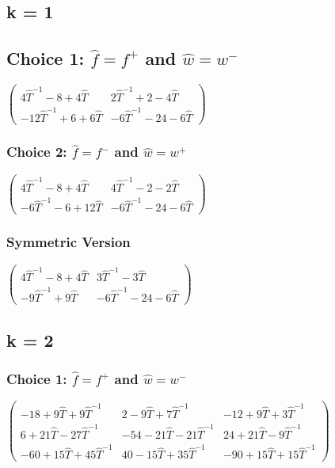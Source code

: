 \documentclass[10pt,letterpaper]{article}
\begin{document}
\subsection{k = 1}
\subsection{Choice 1: $\hat{f} = f^+$ and $\hat{w} = w^-$}
$\left(
\begin{array}{cc}
 4\hat{T}^{-1} -8+4 \hat{T} & 2\hat{T}^{-1}+2-4 \hat{T} \\
 -12 \hat{T}^{-1} +6+6 \hat{T} & -6 \hat{T}^{-1} -24-6 \hat{T}
 \end{array}\right)$
 
 \subsubsection{Choice 2: $\hat{f} = f^-$ and $\hat{w} = w^+$}
 $\left(
\begin{array}{cc}
4\hat{T}^{-1} -8+4 \hat{T} & 4\hat{T}^{-1}-2-2 \hat{T} \\
-6 \hat{T}^{-1} -6+12 \hat{T} & -6 \hat{T}^{-1} -24-6 \hat{T}
\end{array}\right)$

\subsubsection{Symmetric Version}
$\left(\begin{array}{cc}
4\hat{T}^{-1} -8+4 \hat{T} & 3\hat{T}^{-1}-3 \hat{T} \\
-9 \hat{T}^{-1} +9 \hat{T} & -6 \hat{T}^{-1} -24-6 \hat{T}
\end{array}\right)$

\subsection{k = 2}
\subsubsection{Choice 1: $\hat{f} = f^+$ and $\hat{w} = w^-$}
$\left(
\begin{array}{ccc}
 -18+9 \hat{T}+9 \hat{T}^{-1}& 2-9 \hat{T}+7 \hat{T}^{-1}& -12+9 \hat{T}+3 \hat{T}^{-1}\\
 6+21 \hat{T}-27 \hat{T}^{-1}& -54-21 \hat{T}-21 \hat{T}^{-1}& 24+21 \hat{T}-9 \hat{T}^{-1}\\
 -60+15 \hat{T}+45 \hat{T}^{-1}& 40-15 \hat{T}+35 \hat{T}^{-1}& -90+15 \hat{T}+15 \hat{T}^{-1}
\end{array}
\right)$
\end{document}
